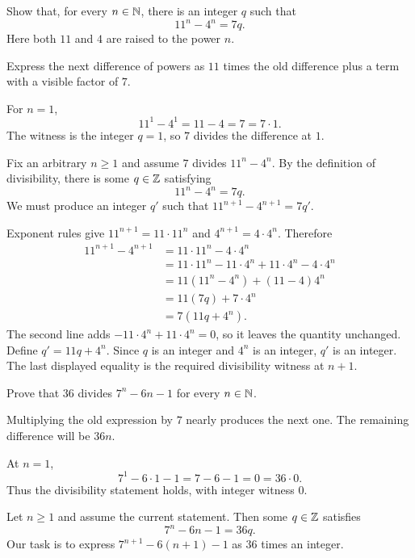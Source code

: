 
\goal Show that, for every $n\in\mathbb{N}$, there is an integer $q$ such that
\[
 11^n-4^n=7q.
\]
Here both $11$ and $4$ are raised to the power $n$.

\idea Express the next difference of powers as $11$ times the old
difference plus a term with a visible factor of $7$.

For $n=1$,
\[
 11^1-4^1=11-4=7=7\cdot1.
\]
The witness is the integer $q=1$, so $7$ divides the difference at $1$.

Fix an arbitrary $n\geq1$ and assume $7$ divides $11^n-4^n$.
By the definition of divisibility, there is some $q\in\mathbb{Z}$ satisfying
\[
 11^n-4^n=7q.
\]
We must produce an integer $q'$ such that
$11^{n+1}-4^{n+1}=7q'$.

Exponent rules give $11^{n+1}=11\cdot11^n$ and
$4^{n+1}=4\cdot4^n$. Therefore
\begin{align*}
 11^{n+1}-4^{n+1}
 &=11\cdot11^n-4\cdot4^n\\
 &=11\cdot11^n-11\cdot4^n+11\cdot4^n-4\cdot4^n\\
 &=11(11^n-4^n)+(11-4)4^n\\
 &=11(7q)+7\cdot4^n\\
 &=7(11q+4^n).
\end{align*}
The second line adds $-11\cdot4^n+11\cdot4^n=0$, so it leaves the
quantity unchanged. Define $q'=11q+4^n$. Since $q$ is an integer and
$4^n$ is an integer, $q'$ is an integer. The last displayed equality
is the required divisibility witness at $n+1$.



\goal Prove that $36$ divides $7^n-6n-1$ for every $n\in\mathbb{N}$.

\idea Multiplying the old expression by $7$ nearly produces the
next one. The remaining difference will be $36n$.

At $n=1$,
\[
 7^1-6\cdot1-1=7-6-1=0=36\cdot0.
\]
Thus the divisibility statement holds, with integer witness $0$.

Let $n\geq1$ and assume the current statement. Then some $q\in\mathbb{Z}$
satisfies
\[
 7^n-6n-1=36q.
\]
Our task is to express $7^{n+1}-6(n+1)-1$ as $36$ times an integer.

